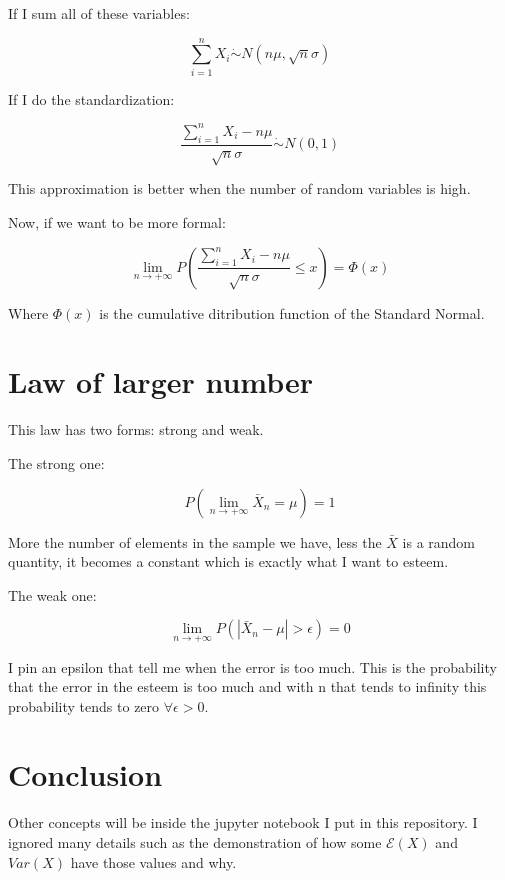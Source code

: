 \documentclass{article}
\begin{document}
\bigskip

If I sum all of these variables:

$$\sum_{i=1}^n X_i \dot \sim N(n\mu,\sqrt{n}\sigma)$$

\bigskip

\bigskip

If I do the standardization:

$$\frac{\sum_{i=1}^n X_i - n\mu}{\sqrt{n}\sigma} \dot \sim N(0,1)$$

This approximation is better when the number of random variables is high.

Now, if we want to be more formal:

$$\lim_{n \rightarrow +\infty} P\left(\frac{\sum_{i=1}^n X_i - n\mu}{\sqrt{n} \sigma} \leq x\right) = \Phi(x)$$

Where $\Phi(x)$ is the cumulative ditribution function of the Standard Normal.

\section{Law of larger number}

This law has two forms: strong and weak.

\bigskip

The strong one:

$$P\left(\lim_{n \rightarrow + \infty} \bar X_n =\mu\right) = 1$$

More the number of elements in the sample we have, less the $\bar X$ is a random quantity, it becomes a constant which is exactly what I want to esteem.


\bigskip

The weak one:

$$\lim_{n \rightarrow + \infty} P\left(|\bar X_n - \mu| > \epsilon\right) = 0$$

I pin an epsilon that tell me when the error is too much. This is the probability that the error in the esteem is too much and with n that tends to infinity this probability tends to zero $\forall \epsilon > 0$.

\section{Conclusion}

Other concepts will be inside the jupyter notebook I put in this repository.
I ignored many details such as the demonstration of how some $\mathcal E(X)$ and $Var(X)$ have those values and why.
\end{document}
